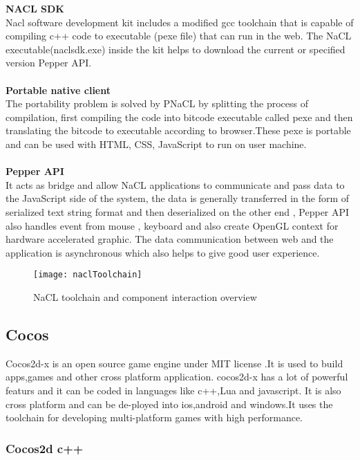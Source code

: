 \documentclass[23pt]{article}
\begin{document}
{  \textbf{NACL SDK}  \\ Nacl software development kit includes a modified gcc toolchain that is capable of compiling c++ code to executable (pexe file) that can run in the web. The NaCL executable(naclsdk.exe) inside the kit helps to download the current or specified version Pepper API. \\ \\  \textbf{ Portable native client} \\ The portability problem is solved by PNaCL by splitting the process of compilation, first compiling the code into bitcode executable called pexe and then translating the bitcode to executable according to browser.These pexe is portable and can be used with HTML, CSS, JavaScript to run on user machine.\\  \\   \textbf{Pepper API} \\ It acts as bridge and allow NaCL applications to communicate and pass data to the JavaScript side of the system, the data is generally transferred in the form of serialized text string format and then deserialized on the other end , Pepper API also handles event from mouse , keyboard and also create OpenGL context for hardware accelerated graphic. The data communication between web and the application is asynchronous which also helps to give good user experience.\\    \par}

\begin{figure}[h]
\caption{NaCL toolchain and component interaction overview}
\centering
\texttt{[image: naclToolchain]}
\end{figure}

\newpage

\subsection{Cocos }

{\Large  Cocos2d-x is an open source game engine under MIT license .It is used to build apps,games and other cross platform application. cocos2d-x has a lot of powerful featurs and it can be coded in languages like c++,Lua and javascript. It is also cross platform and can be de-ployed into ios,android and windows.It uses the toolchain for developing multi-platform games with high performance. \par}

\subsubsection{Cocos2d c++ }
\end{document}
